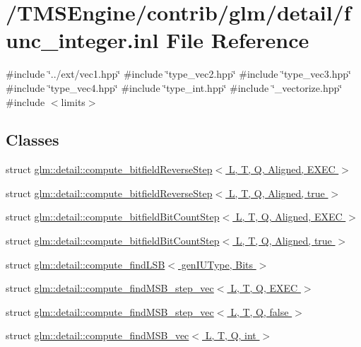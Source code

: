 \hypertarget{func__integer_8inl}{}\section{/\+T\+M\+S\+Engine/contrib/glm/detail/func\+\_\+integer.inl File Reference}
\label{func__integer_8inl}
{\ttfamily \#include \char`\"{}../ext/vec1.\+hpp\char`\"{}}\newline
{\ttfamily \#include \char`\"{}type\+\_\+vec2.\+hpp\char`\"{}}\newline
{\ttfamily \#include \char`\"{}type\+\_\+vec3.\+hpp\char`\"{}}\newline
{\ttfamily \#include \char`\"{}type\+\_\+vec4.\+hpp\char`\"{}}\newline
{\ttfamily \#include \char`\"{}type\+\_\+int.\+hpp\char`\"{}}\newline
{\ttfamily \#include \char`\"{}\+\_\+vectorize.\+hpp\char`\"{}}\newline
{\ttfamily \#include $<$limits$>$}\newline
\subsection*{Classes}
\begin{DoxyCompactItemize}
\item 
struct \hyperlink{structglm_1_1detail_1_1compute__bitfield_reverse_step}{glm\+::detail\+::compute\+\_\+bitfield\+Reverse\+Step$<$ L, T, Q, Aligned, E\+X\+E\+C $>$}
\item 
struct \hyperlink{structglm_1_1detail_1_1compute__bitfield_reverse_step_3_01_l_00_01_t_00_01_q_00_01_aligned_00_01true_01_4}{glm\+::detail\+::compute\+\_\+bitfield\+Reverse\+Step$<$ L, T, Q, Aligned, true $>$}
\item 
struct \hyperlink{structglm_1_1detail_1_1compute__bitfield_bit_count_step}{glm\+::detail\+::compute\+\_\+bitfield\+Bit\+Count\+Step$<$ L, T, Q, Aligned, E\+X\+E\+C $>$}
\item 
struct \hyperlink{structglm_1_1detail_1_1compute__bitfield_bit_count_step_3_01_l_00_01_t_00_01_q_00_01_aligned_00_01true_01_4}{glm\+::detail\+::compute\+\_\+bitfield\+Bit\+Count\+Step$<$ L, T, Q, Aligned, true $>$}
\item 
struct \hyperlink{structglm_1_1detail_1_1compute__find_l_s_b}{glm\+::detail\+::compute\+\_\+find\+L\+S\+B$<$ gen\+I\+U\+Type, Bits $>$}
\item 
struct \hyperlink{structglm_1_1detail_1_1compute__find_m_s_b__step__vec}{glm\+::detail\+::compute\+\_\+find\+M\+S\+B\+\_\+step\+\_\+vec$<$ L, T, Q, E\+X\+E\+C $>$}
\item 
struct \hyperlink{structglm_1_1detail_1_1compute__find_m_s_b__step__vec_3_01_l_00_01_t_00_01_q_00_01false_01_4}{glm\+::detail\+::compute\+\_\+find\+M\+S\+B\+\_\+step\+\_\+vec$<$ L, T, Q, false $>$}
\item 
struct \hyperlink{structglm_1_1detail_1_1compute__find_m_s_b__vec}{glm\+::detail\+::compute\+\_\+find\+M\+S\+B\+\_\+vec$<$ L, T, Q, int $>$}
\end{DoxyCompactItemize}

